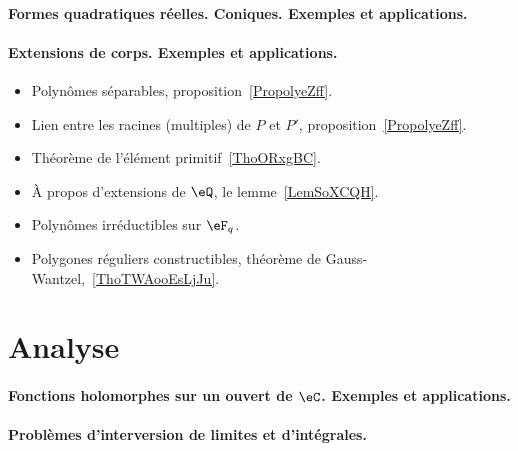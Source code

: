 \paragraph{Formes quadratiques réelles. Coniques. Exemples et applications.}
\paragraph{Extensions de corps. Exemples et applications.}
\begin{itemize}
    \item Polynômes séparables, proposition~\ref{PropolyeZff}.
    \item Lien entre les racines (multiples) de \( P\) et \( P'\), proposition~\ref{PropolyeZff}.
    \item Théorème de l'élément primitif~\ref{ThoORxgBC}.
    \item À propos d'extensions de \( \eQ\), le lemme~\ref{LemSoXCQH}.
    \item Polynômes irréductibles sur \( \eF_q\).
    \item Polygones réguliers constructibles, théorème de Gauss-Wantzel,~\ref{ThoTWAooEsLjJu}.
\end{itemize}
\section{Analyse}

\paragraph{Fonctions holomorphes sur un ouvert de $\eC$. Exemples et applications.}
\paragraph{Problèmes d'interversion de limites et d'intégrales.}
